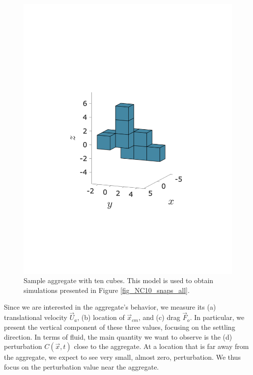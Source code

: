 \begin{figure}[ht]
	\begin{center}
		\includegraphics[scale=0.5]{./figures/fig_sample_agg10.pdf}
		\caption{Sample aggregate with ten cubes. This model is used to obtain simulations presented in Figure \ref{fig_NC10_snaps_all}.}
		\label{fig_sample_agg10}
	\end{center}
\end{figure}
\par
Since we are interested in the aggregate's behavior, we measure its (a) translational velocity $\vec{U}_a$, (b) location of $\vec{x}_{cm}$, and (c) drag $\vec{F}_o$. In particular, we present the vertical component of these three values, focusing on the settling direction.
In terms of fluid, the main quantity we want to observe is the (d) perturbation $C(\vec{x},t)$ close to the aggregate. At a location that is far away from the aggregate, we expect to see very small, almost zero, perturbation.
We thus focus on the perturbation value near the aggregate.
\par
